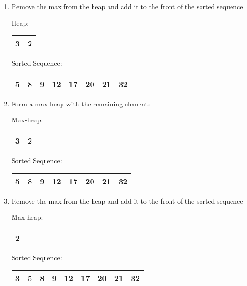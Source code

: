 \documentclass[fleqn, 12pt]{article}
\begin{document}
\begin{enumerate}[Step 1:]
\item Remove the max from the heap and add it to the front of the sorted sequence
    \begin{center}
        Heap:
        \begin{tabular}{|*{2}{c|}}
            \hline
            3 & 2\\
            \hline
        \end{tabular}
    \end{center}
    \begin{center}
        Sorted Sequence:
        \begin{tabular}{|*{8}{c|}}
            \hline
            \underline{5} & 8 & 9 & 12 & 17 & 20 & 21 & 32\\
            \hline
        \end{tabular}
    \end{center}
    
\item Form a max-heap with the remaining elements
    \begin{center}
        Max-heap:
        \begin{tabular}{|*{2}{c|}}
            \hline
            3 & 2\\
            \hline
        \end{tabular}
    \end{center}
    \begin{center}
        Sorted Sequence:
        \begin{tabular}{|*{8}{c|}}
            \hline
            5 & 8 & 9 & 12 & 17 & 20 & 21 & 32\\
            \hline
        \end{tabular}
    \end{center}
    
\item Remove the max from the heap and add it to the front of the sorted sequence
    \begin{center}
        Max-heap:
        \begin{tabular}{|*{1}{c|}}
            \hline
            2\\
            \hline
        \end{tabular}
    \end{center}
    \begin{center}
        Sorted Sequence:
        \begin{tabular}{|*{9}{c|}}
            \hline
            \underline{3} & 5 & 8 & 9 & 12 & 17 & 20 & 21 & 32\\
            \hline
        \end{tabular}
    \end{center}
    \newpage
    

\end{enumerate}
\end{document}
